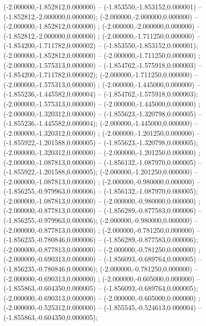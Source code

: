  (-2.000000,-1.852812,0.000000) -- (-1.853550,-1.853152,0.000001) -- (-1.852812,-2.000000,0.000000);
 (-2.000000,-2.000000,0.000000) -- (-2.000000,-1.852812,0.000000) ;
 (-2.000000,-2.000000,0.000000) -- (-1.852812,-2.000000,0.000000) ;
 (-2.000000,-1.711250,0.000000) -- (-1.854200,-1.711782,0.000002) -- (-1.853550,-1.853152,0.000001);
 (-2.000000,-1.852812,0.000000) -- (-2.000000,-1.711250,0.000000) ;
 (-2.000000,-1.575313,0.000000) -- (-1.854762,-1.575918,0.000003) -- (-1.854200,-1.711782,0.000002);
 (-2.000000,-1.711250,0.000000) -- (-2.000000,-1.575313,0.000000) ;
 (-2.000000,-1.445000,0.000000) -- (-1.855236,-1.445582,0.000004) -- (-1.854762,-1.575918,0.000003);
 (-2.000000,-1.575313,0.000000) -- (-2.000000,-1.445000,0.000000) ;
 (-2.000000,-1.320312,0.000000) -- (-1.855623,-1.320798,0.000005) -- (-1.855236,-1.445582,0.000004);
 (-2.000000,-1.445000,0.000000) -- (-2.000000,-1.320312,0.000000) ;
 (-2.000000,-1.201250,0.000000) -- (-1.855922,-1.201588,0.000005) -- (-1.855623,-1.320798,0.000005);
 (-2.000000,-1.320312,0.000000) -- (-2.000000,-1.201250,0.000000) ;
 (-2.000000,-1.087813,0.000000) -- (-1.856132,-1.087970,0.000005) -- (-1.855922,-1.201588,0.000005);
 (-2.000000,-1.201250,0.000000) -- (-2.000000,-1.087813,0.000000) ;
 (-2.000000,-0.980000,0.000000) -- (-1.856255,-0.979963,0.000006) -- (-1.856132,-1.087970,0.000005);
 (-2.000000,-1.087813,0.000000) -- (-2.000000,-0.980000,0.000000) ;
 (-2.000000,-0.877813,0.000000) -- (-1.856289,-0.877583,0.000006) -- (-1.856255,-0.979963,0.000006);
 (-2.000000,-0.980000,0.000000) -- (-2.000000,-0.877813,0.000000) ;
 (-2.000000,-0.781250,0.000000) -- (-1.856235,-0.780846,0.000006) -- (-1.856289,-0.877583,0.000006);
 (-2.000000,-0.877813,0.000000) -- (-2.000000,-0.781250,0.000000) ;
 (-2.000000,-0.690313,0.000000) -- (-1.856093,-0.689764,0.000005) -- (-1.856235,-0.780846,0.000006);
 (-2.000000,-0.781250,0.000000) -- (-2.000000,-0.690313,0.000000) ;
 (-2.000000,-0.605000,0.000000) -- (-1.855863,-0.604350,0.000005) -- (-1.856093,-0.689764,0.000005);
 (-2.000000,-0.690313,0.000000) -- (-2.000000,-0.605000,0.000000) ;
 (-2.000000,-0.525312,0.000000) -- (-1.855545,-0.524613,0.000004) -- (-1.855863,-0.604350,0.000005);
